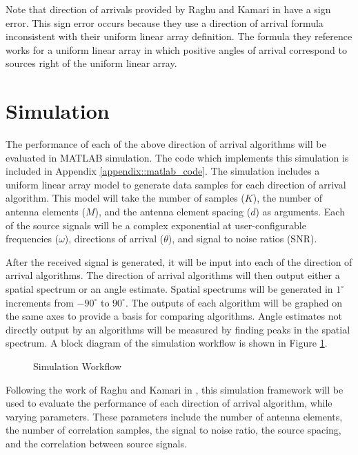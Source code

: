 \documentclass[conference]{IEEEtran}
\begin{document}
		Note that direction of arrivals provided by Raghu and Kamari in \cite{doa_algorithms_raghu} have a sign error. This sign error occurs because they use a direction of arrival formula inconsistent with their uniform linear array definition. The formula they reference works for a uniform linear array in which positive angles of arrival correspond to sources right of the uniform linear array.
		
	\section{Simulation}
	
		The performance of each of the above direction of arrival algorithms will be evaluated in MATLAB simulation. The code which implements this simulation is included in Appendix \ref{appendix::matlab_code}. The simulation includes a uniform linear array model to generate data samples for each direction of arrival algorithm. This model will take the number of samples ($K$), the number of antenna elements ($M$), and the antenna element spacing ($d$) as arguments. Each of the source signals will be a complex exponential at user-configurable frequencies ($\omega$), directions of arrival ($\theta$), and signal to noise ratios (SNR).
		
		After the received signal is generated, it will be input into each of the direction of arrival algorithms. The direction of arrival algorithms will then output either a spatial spectrum or an angle estimate. Spatial spectrums will be generated in $1^{\circ}$ increments from $-90^{\circ}$ to $90^{\circ}$. The outputs of each algorithm will be graphed on the same axes to provide a basis for comparing algorithms. Angle estimates not directly output by an algorithms will be measured by finding peaks in the spatial spectrum. A block diagram of the simulation workflow is shown in Figure \ref{fig::sim_workflow}.
		
		\begin{figure}[H]
			\centerline{}
			\caption{Simulation Workflow}
			\label{fig::sim_workflow}
		\end{figure}
		
		Following the work of Raghu and Kamari in \cite{doa_algorithms_raghu}, this simulation framework will be used to evaluate the performance of each direction of arrival algorithm, while varying parameters. These parameters include the number of antenna elements, the number of correlation samples, the signal to noise ratio, the source spacing, and the correlation between source signals.
		
\end{document}
